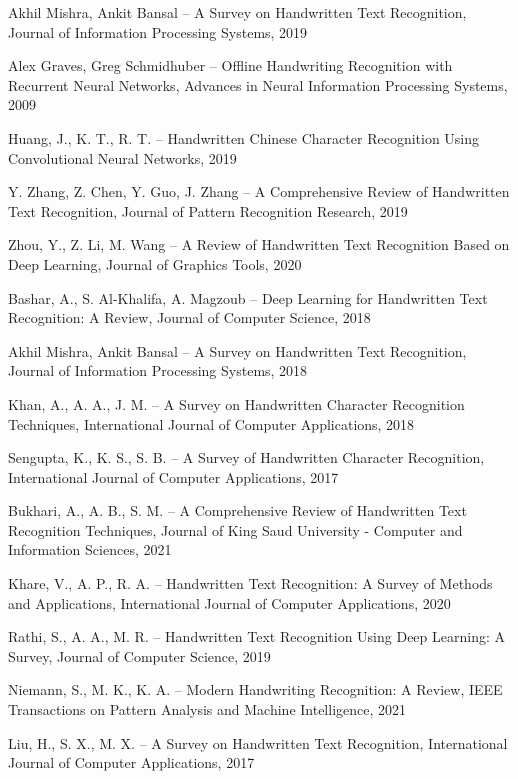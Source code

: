 \documentclass{article}
\begin{document}
\begin{thebibliography}{00}
Akhil Mishra, Ankit Bansal -- A Survey on Handwritten Text Recognition, Journal of Information Processing Systems, 2019
	
Alex Graves, Greg Schmidhuber -- Offline Handwriting Recognition with Recurrent Neural Networks, Advances in Neural Information Processing Systems, 2009
	
Huang, J., K. T., R. T. -- Handwritten Chinese Character Recognition Using Convolutional Neural Networks, 2019
	
Y. Zhang, Z. Chen, Y. Guo, J. Zhang -- A Comprehensive Review of Handwritten Text Recognition, Journal of Pattern Recognition Research, 2019
	
Zhou, Y., Z. Li, M. Wang -- A Review of Handwritten Text Recognition Based on Deep Learning, Journal of Graphics Tools, 2020
	
Bashar, A., S. Al-Khalifa, A. Magzoub -- Deep Learning for Handwritten Text Recognition: A Review, Journal of Computer Science, 2018
	
Akhil Mishra, Ankit Bansal -- A Survey on Handwritten Text Recognition, Journal of Information Processing Systems, 2018
	
Khan, A., A. A., J. M. -- A Survey on Handwritten Character Recognition Techniques, International Journal of Computer Applications, 2018
	
Sengupta, K., K. S., S. B. -- A Survey of Handwritten Character Recognition, International Journal of Computer Applications, 2017
	
Bukhari, A., A. B., S. M. -- A Comprehensive Review of Handwritten Text Recognition Techniques, Journal of King Saud University - Computer and Information Sciences, 2021
	
Khare, V., A. P., R. A. -- Handwritten Text Recognition: A Survey of Methods and Applications, International Journal of Computer Applications, 2020
	
Rathi, S., A. A., M. R. -- Handwritten Text Recognition Using Deep Learning: A Survey, Journal of Computer Science, 2019
	
Niemann, S., M. K., K. A. -- Modern Handwriting Recognition: A Review, IEEE Transactions on Pattern Analysis and Machine Intelligence, 2021
	
Liu, H., S. X., M. X. -- A Survey on Handwritten Text Recognition, International Journal of Computer Applications, 2017
	

\end{thebibliography}
\end{document}
